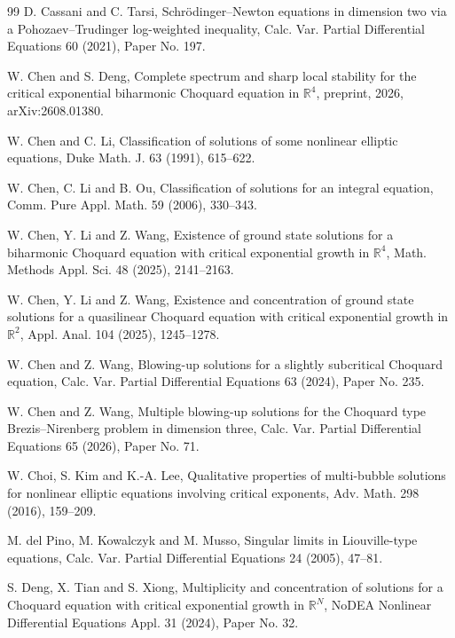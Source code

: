 \documentclass[11pt]{article}
\numberwithin{equation}{section}
\begin{document}
\begin{thebibliography}{99}
D. Cassani and C. Tarsi,
Schr\"odinger--Newton equations in dimension two via a
Pohozaev--Trudinger log-weighted inequality,
Calc. Var. Partial Differential Equations 60 (2021), Paper No. 197.


W. Chen and S. Deng,
Complete spectrum and sharp local stability for the critical exponential biharmonic Choquard equation in $\mathbb R^{4}$, 
preprint, 2026, arXiv:2608.01380.

W. Chen and C. Li,
Classification of solutions of some nonlinear elliptic equations,
Duke Math. J. 63 (1991), 615--622.

W. Chen, C. Li and B. Ou,
Classification of solutions for an integral equation,
Comm. Pure Appl. Math. 59 (2006), 330--343.

W. Chen, Y. Li and Z. Wang,
Existence of ground state solutions for a biharmonic Choquard equation with critical exponential growth in $\mathbb R^{4}$,
Math. Methods Appl. Sci. 48 (2025), 2141--2163.

W. Chen, Y. Li and Z. Wang,
Existence and concentration of ground state solutions for a
quasilinear Choquard equation with critical exponential growth in
$\mathbb R^2$,
Appl. Anal. 104 (2025), 1245--1278.



W. Chen and Z. Wang,
Blowing-up solutions for a slightly subcritical Choquard equation,
Calc. Var. Partial Differential Equations 63 (2024), Paper No. 235.

W. Chen and Z. Wang,
Multiple blowing-up solutions for the Choquard type Brezis--Nirenberg problem in dimension three,
Calc. Var. Partial Differential Equations 65 (2026), Paper No. 71.

W. Choi, S. Kim and K.-A. Lee,
Qualitative properties of multi-bubble solutions for nonlinear elliptic equations involving critical exponents,
Adv. Math. 298 (2016), 159--209.

M. del Pino, M. Kowalczyk and M. Musso,
Singular limits in Liouville-type equations,
Calc. Var. Partial Differential Equations 24 (2005), 47--81.



S. Deng, X. Tian and S. Xiong,
Multiplicity and concentration of solutions for a Choquard equation with critical exponential growth in $\mathbb R^{N}$,
NoDEA Nonlinear Differential Equations Appl. 31 (2024), Paper No. 32.


\end{thebibliography}
\end{document}
